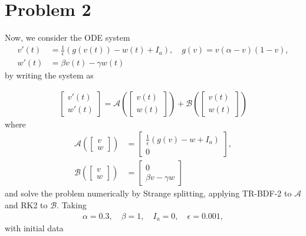 \documentclass{article}
\begin{document}
\section{Problem 2}
Now, we consider the ODE system \begin{align*} v'(t) &= \frac 1 \epsilon \left( g(v(t)) - w(t) + I_a \right), \quad g(v) = v (\alpha - v) (1-v),\\
	w'(t) &= \beta v(t) - \gamma w(t)\end{align*}
by writing the system as

\begin{align*}
	\begin{bmatrix} v'(t) \\ w'(t) \end{bmatrix} = \mathcal A\left(\begin{bmatrix} v(t) \\ w(t) \end{bmatrix} \right) + \mathcal B\left(\begin{bmatrix} v(t) \\ w(t) \end{bmatrix} \right)
\end{align*} where \begin{align*}
	\mathcal A \left(\begin{bmatrix} v \\ w \end{bmatrix} \right) &= \begin{bmatrix} \frac 1 \epsilon \left( g(v) - w+ I_a \right) \\ 0\end{bmatrix}, \\
	\mathcal B \left(\begin{bmatrix} v \\ w \end{bmatrix} \right) &= \begin{bmatrix} 0 \\ \beta v - \gamma w\end{bmatrix}
\end{align*}
and solve the problem numerically by Strange splitting, applying TR-BDF-2 to $\mathcal{A}$ and RK2 to $\mathcal{B}$. Taking \begin{align*} \alpha = 0.3, \quad \beta = 1, \quad I_a = 0, \quad \epsilon = 0.001,
\end{align*}
with initial data
\end{document}
